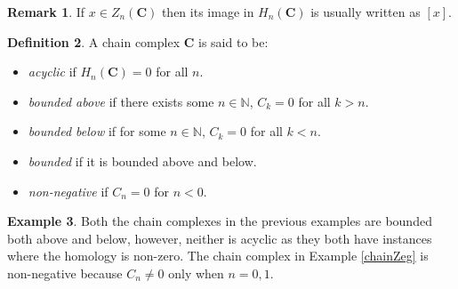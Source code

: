 \documentclass[11.5pt, twoside, a4paper, titlepage]{report}
\theoremstyle{definition}
\newtheorem{mydef}{Definition}[section]
\newtheorem{rem}[mydef]{Remark}
\newtheorem{eg}[mydef]{Example}
\theoremstyle{plain}
\begin{document}
\begin{rem} %
If $x\in Z_n(\mathbf{C})$ then its image in $H_n(\mathbf{C})$ is usually written as $[x]$.
\end{rem}

\begin{mydef}
A chain complex $\mathbf{C}$ is said to be:
\begin{itemize}
\item \emph{acyclic} if $H_n(\mathbf{C})=0$ for all $n$.
\item \emph{bounded above} if there exists some $n\in \mathbb{N}$, $C_k=0$ for all $k>n$.
\item \emph{bounded below} if for some $n \in \mathbb{N}$, $C_k=0$ for all $k<n$.
\item \emph{bounded} if it is bounded above and below.
\item \emph{non-negative}  if $C_n=0$ for $n<0$.
\end{itemize}
\end{mydef}

\begin{eg}
Both the chain complexes in the previous examples are bounded both above and below, however, neither is acyclic as they both have instances where the homology is non-zero. The chain complex in Example \ref{chainZeg} is non-negative because $C_n\neq 0$ only when $n=0,1$.
\end{eg}
\end{document}
